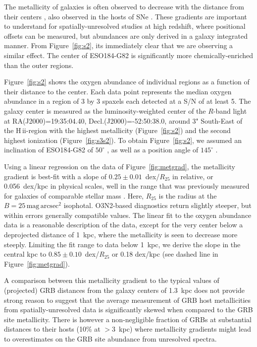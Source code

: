 \documentclass[traditabstract]{aa}
\newcommand{\hii}{\mbox{H\,{\sc ii}}}
\begin{document}
The metallicity of galaxies is often observed to decrease with the distance from their centers \citep[e.g.,][]{1994ApJ...420...87Z, 2014A&A...563A..49S}, also observed in the hosts of SNe \citep{2016A&A...591A..48G}. These gradients are important to understand for spatially-unresolved studies at high redshift, where positional offsets can be measured, but abundances are only derived in a galaxy integrated manner. From Figure~\ref{fig:s2}, its immediately clear that we are observing a similar effect. The center of ESO184-G82 is significantly more chemically-enriched than the outer regions. 

Figure~\ref{fig:s2} shows the oxygen abundance of individual regions as a function of their distance to the center. Each data point represents the median oxygen abundance in a region of 3 by 3 spaxels each detected at a S/N of at least 5. The galaxy center is measured as the luminosity-weighted center of the $R$-band light at RA(J2000)=19:35:04.40, Decl.(J2000)=-52:50:38.0, around 3" South-East of the \hii-region with the highest metallicity (Figure~\ref{fig:s2}) and the second highest ionization (Figure~\ref{fig:s3s2}). To obtain Figure~\ref{fig:s2}, we assumed an inclination of ESO184-G82 of $50^{\circ}$ \citep{2008A&A...490...45C, 2015MNRAS.454L..51A}, as well as a position angle of $145^{\circ}$ \citep{1989spce.book.....L}. 

Using a linear regression on the data of Figure~\ref{fig:metgrad}, the metallicity gradient is best-fit with a slope of $0.25\pm0.01$~dex/$R_{25}$ in relative, or 0.056~dex/kpc in physical scales, well in the range that was previously measured for galaxies of comparable stellar mass \citep{2015MNRAS.448.2030H}. Here, $R_{25}$ is the radius at the $B=25\,\mathrm{mag}\,\mathrm{arcsec}^2$ isophotal. O3N2-based diagnostics return slightly steeper, but within errors generally compatible values. The linear fit to the oxygen abundance data is a reasonable description of the data, except for the very center below a deprojected distance of 1~kpc, where the metallicity is seen to decrease more steeply. Limiting the fit range to data below 1~kpc, we derive the slope in the central kpc to $0.85\pm0.10$~dex/$R_{25}$ or 0.18 dex/kpc (see dashed line in Figure~\ref{fig:metgrad}). 

A comparison between this metallicity gradient to the typical values of (projected) GRB distances from the galaxy centers of 1.3~kpc \citep{2016ApJ...817..144B} does not provide strong reason to suggest that the average measurement of GRB host metallicities from spatially-unresolved data is significantly skewed when compared to the GRB site metallicity. There is however a non-negligible fraction of GRBs at substantial distances to their hosts (10\% at $>3$~kpc) where metallicity gradients might lead to overestimates on the GRB site abundance from unresolved spectra.
\end{document}
